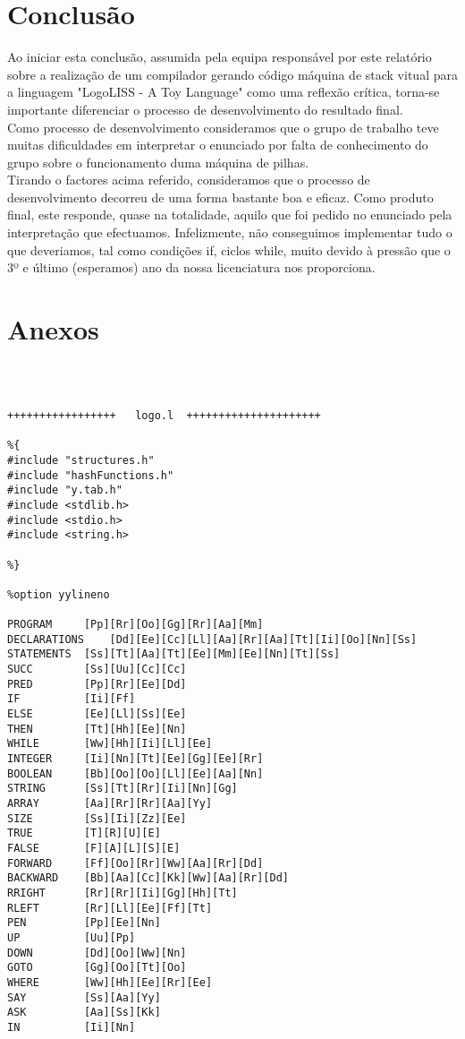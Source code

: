 \documentclass[12pt,a4paper,oneside]{article}
\newenvironment{codefold}{}{}
\begin{document}
\begin{codefold}
\newpage
\section{Conclusão}

\indent Ao iniciar esta conclusão, assumida pela equipa responsável por este relatório sobre a realização de um compilador gerando código máquina de stack vitual para a
linguagem "LogoLISS - A Toy Language" como uma reflexão crítica, torna-se importante diferenciar o processo de desenvolvimento do resultado final.\\
\indent Como processo de desenvolvimento consideramos que o grupo de trabalho teve muitas dificuldades em interpretar o enunciado por falta de conhecimento do grupo
sobre o funcionamento duma máquina de pilhas.\\
\indent Tirando o factores acima referido, consideramos que o processo de desenvolvimento decorreu de uma forma bastante boa e eficaz. Como produto final, este responde,
quase na totalidade, aquilo que foi pedido no enunciado pela interpretação que efectuamos.
\indent Infelizmente, não conseguimos implementar tudo o que deveriamos, tal como condições if, ciclos while, muito devido à pressão que o 3º e último (esperamos) ano da
nossa licenciatura nos proporciona.\\


\newpage
\appendix

\section{Anexos}

\begin{verbatim}
                                                                     
                                                                     
                                             
+++++++++++++++++   logo.l  +++++++++++++++++++++

%{
#include "structures.h"
#include "hashFunctions.h"
#include "y.tab.h"
#include <stdlib.h>
#include <stdio.h>
#include <string.h>

%}

%option yylineno

PROGRAM 	[Pp][Rr][Oo][Gg][Rr][Aa][Mm]
DECLARATIONS 	[Dd][Ee][Cc][Ll][Aa][Rr][Aa][Tt][Ii][Oo][Nn][Ss]
STATEMENTS 	[Ss][Tt][Aa][Tt][Ee][Mm][Ee][Nn][Tt][Ss]
SUCC 		[Ss][Uu][Cc][Cc]
PRED 		[Pp][Rr][Ee][Dd]
IF 			[Ii][Ff]
ELSE		[Ee][Ll][Ss][Ee]
THEN		[Tt][Hh][Ee][Nn]
WHILE		[Ww][Hh][Ii][Ll][Ee]
INTEGER		[Ii][Nn][Tt][Ee][Gg][Ee][Rr]
BOOLEAN		[Bb][Oo][Oo][Ll][Ee][Aa][Nn]
STRING		[Ss][Tt][Rr][Ii][Nn][Gg]
ARRAY		[Aa][Rr][Rr][Aa][Yy]
SIZE		[Ss][Ii][Zz][Ee]
TRUE		[T][R][U][E]
FALSE		[F][A][L][S][E]
FORWARD		[Ff][Oo][Rr][Ww][Aa][Rr][Dd]
BACKWARD	[Bb][Aa][Cc][Kk][Ww][Aa][Rr][Dd]
RRIGHT		[Rr][Rr][Ii][Gg][Hh][Tt]
RLEFT		[Rr][Ll][Ee][Ff][Tt]
PEN			[Pp][Ee][Nn]
UP			[Uu][Pp]
DOWN		[Dd][Oo][Ww][Nn]
GOTO		[Gg][Oo][Tt][Oo]
WHERE		[Ww][Hh][Ee][Rr][Ee]
SAY			[Ss][Aa][Yy]
ASK			[Aa][Ss][Kk]
IN			[Ii][Nn]


\end{verbatim}
\end{codefold}
\end{document}
